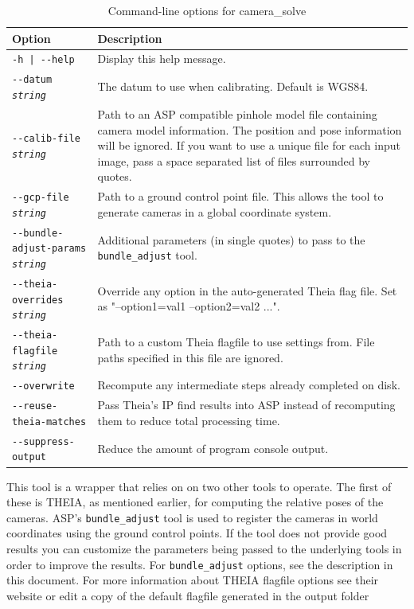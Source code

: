 \begin{longtable}{|l|p{7.5cm}|}
\caption{Command-line options for camera\_solve}
\label{tbl:camerasolve}
\endfirsthead
\endhead
\endfoot
\endlastfoot
\hline
Option & Description \\ \hline \hline
\texttt{-h | -\/-help } & Display this help message.\\ \hline
\texttt{-\/-datum  \textit{string}} & The datum to use when calibrating.  Default is WGS84.\\ \hline
\texttt{-\/-calib-file  \textit{string}} & Path to an ASP compatible pinhole model file containing 
camera model information. The position and pose information will be ignored. If you want 
to use a unique file for each input image, pass a space separated list of files surrounded by quotes.\\ \hline
\texttt{-\/-gcp-file  \textit{string}} & Path to a ground control point file.  This allows
the tool to generate cameras in a global coordinate system.\\ \hline
\texttt{-\/-bundle-adjust-params  \textit{string}} & Additional parameters (in single quotes)
to pass to the \texttt{bundle\_adjust} tool.\\ \hline
\texttt{-\/-theia-overrides  \textit{string}} & Override any option in the auto-generated Theia flag file. Set as "--option1=val1 --option2=val2 ...".\\ \hline
\texttt{-\/-theia-flagfile  \textit{string}} & Path to a custom Theia flagfile to use settings from.
File paths specified in this file are ignored.\\ \hline
\texttt{-\/-overwrite}  & Recompute any intermediate steps already completed on disk.\\ \hline
\texttt{-\/-reuse-theia-matches}  & Pass Theia's IP find results into ASP instead of recomputing 
them to reduce total processing time.\\ \hline
\texttt{-\/-suppress-output} & Reduce the amount of program console output.\\ \hline
\end{longtable}

This tool is a wrapper that relies on on two other tools to operate.
The first of these is THEIA, as mentioned earlier, for computing the
relative poses of the cameras.  ASP's \texttt{bundle\_adjust} tool is
used to register the cameras in world coordinates using the ground
control points.  If the tool does not provide good results you can
customize the parameters being passed to the underlying tools in order
to improve the results.  For \texttt{bundle\_adjust} options, see the
description in this document.  For more information about THEIA flagfile
options see their website or edit a copy of the default flagfile
generated in the output folder

